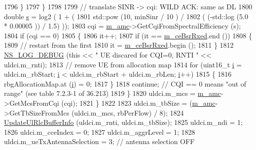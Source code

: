 \begin{DoxyCode}
1796                 \}
1797             \}
1798 
1799           \textcolor{comment}{// translate SINR -> cqi: WILD ACK: same as DL}
1800           \textcolor{keywordtype}{double} \hyperlink{generate__test__data__lte__sinr_8m_ad83eeb3a142285d1243a08c6b7026df8}{s} = log2 ( 1 + (
1801                               std::pow (10, minSinr / 10 )  /
1802                               ( (-std::log (5.0 * 0.00005 )) / 1.5) ));
1803           cqi = \hyperlink{classns3_1_1PfFfMacScheduler_a8ed3fd6ae921b6161a10c2c9b0e869a4}{m\_amc}->GetCqiFromSpectralEfficiency (s);
1804           \textcolor{keywordflow}{if} (cqi == 0)
1805             \{
1806               it++;
1807               \textcolor{keywordflow}{if} (it == \hyperlink{classns3_1_1PfFfMacScheduler_a9d4cd2380a8e04f1e7d69ac67628b9cc}{m\_ceBsrRxed}.end ())
1808                 \{
1809                   \textcolor{comment}{// restart from the first}
1810                   it = \hyperlink{classns3_1_1PfFfMacScheduler_a9d4cd2380a8e04f1e7d69ac67628b9cc}{m\_ceBsrRxed}.begin ();
1811                 \}
1812               \hyperlink{group__logging_ga413f1886406d49f59a6a0a89b77b4d0a}{NS\_LOG\_DEBUG} (\textcolor{keyword}{this} << \textcolor{stringliteral}{" UE discared for CQI=0, RNTI "} << uldci.m\_rnti);
1813               \textcolor{comment}{// remove UE from allocation map}
1814               \textcolor{keywordflow}{for} (uint16\_t \hyperlink{bernuolliDistribution_8m_a6f6ccfcf58b31cb6412107d9d5281426}{i} = uldci.m\_rbStart; \hyperlink{bernuolliDistribution_8m_a6f6ccfcf58b31cb6412107d9d5281426}{i} < uldci.m\_rbStart + uldci.m\_rbLen; 
      \hyperlink{bernuolliDistribution_8m_a6f6ccfcf58b31cb6412107d9d5281426}{i}++)
1815                 \{
1816                   rbgAllocationMap.at (\hyperlink{bernuolliDistribution_8m_a6f6ccfcf58b31cb6412107d9d5281426}{i}) = 0;
1817                 \}
1818               \textcolor{keywordflow}{continue}; \textcolor{comment}{// CQI == 0 means "out of range" (see table 7.2.3-1 of 36.213)}
1819             \}
1820           uldci.m\_mcs = \hyperlink{classns3_1_1PfFfMacScheduler_a8ed3fd6ae921b6161a10c2c9b0e869a4}{m\_amc}->GetMcsFromCqi (cqi);
1821         \}
1822 
1823       uldci.m\_tbSize = (\hyperlink{classns3_1_1PfFfMacScheduler_a8ed3fd6ae921b6161a10c2c9b0e869a4}{m\_amc}->GetTbSizeFromMcs (uldci.m\_mcs, rbPerFlow) / 8);
1824       \hyperlink{classns3_1_1PfFfMacScheduler_a5c0ac12d11b85ed7b27e81b278ded55d}{UpdateUlRlcBufferInfo} (uldci.m\_rnti, uldci.m\_tbSize);
1825       uldci.m\_ndi = 1;
1826       uldci.m\_cceIndex = 0;
1827       uldci.m\_aggrLevel = 1;
1828       uldci.m\_ueTxAntennaSelection = 3; \textcolor{comment}{// antenna selection OFF}

\end{DoxyCode}
